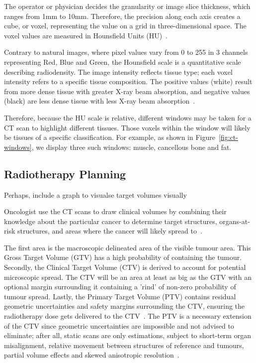 \documentclass[12pt,twoside]{report}
\begin{document}
The operator or physician decides the granularity or image slice thickness, which ranges from 1mm to 10mm. Therefore, the precision along each axis creates a cube, or voxel, representing the value on a grid in three-dimensional space. The voxel values are measured in Hounsfield Units (HU)~\cite{diagnostic-radiology-physics}. 

Contrary to natural images, where pixel values vary from 0 to 255 in 3 channels representing Red, Blue and Green, the Hounsfield scale is a quantitative scale describing radiodensity. The image intensity reflects tissue type; each voxel intensity refers to a specific tissue composition. The positive values (white) result from more dense tissue with greater X-ray beam absorption, and negative values (black) are less dense tissue with less X-ray beam absorption~\cite{Statpearls}.  

Therefore, because the HU scale is relative, different windows may be taken for a CT scan to highlight different tissues. Those voxels within the window will likely be tissues of a specific classification. For example, as shown in Figure~\ref{fig:ct-windows}, we display three such windows: muscle, cancellous bone and fat.

\subsection{Radiotherapy Planning}\label{sect:radiotherapy-planning}

\begin{warning}
  Perhaps, include a graph to visualse target volumes visually
\end{warning}

Oncologist use the CT scans to draw clinical volumes by combining their knowledge about the particular cancer to determine target structures, organs-at-risk structures, and areas where the cancer will likely spread to~\cite{AMLART-data}. 

The first area is the macroscopic delineated area of the visible tumour area. This Gross Target Volume (GTV) has a high probability of containing the tumour. Secondly, the Clinical Target Volume (CTV) is derived to account for potential microscopic spread. The CTV will be an area at least as big as the GTV with an optional margin surrounding it containing a 'rind' of non-zero probability of tumour spread. Lastly, the Primary Target Volume (PTV) contains residual geometric uncertainties and safety margins surrounding the CTV, ensuring the radiotherapy dose gets delivered to the CTV~\cite{tumor-delineation,defining-target-volumes,Lin2021-oz,personalised-PTV-strategies}. The PTV is a necessary extension of the CTV since geometric uncertainties are impossible and not advised to eliminate; after all, static scans are only estimations, subject to short-term organ misalignment, relative movement between structures of reference and tumours, partial volume effects and skewed anisotropic resolution~\cite{VANHERK200452}.
\end{document}
